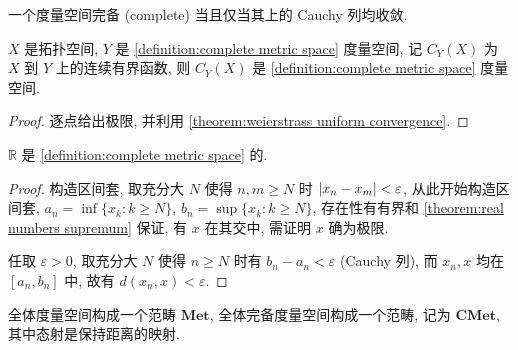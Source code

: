 \begin{definition}[完备]
    \label {definition:complete metric space}
    一个度量空间完备 (complete) 当且仅当其上的 Cauchy 列均收敛.
\end{definition}

\begin{corollary}
    \(X\) 是拓扑空间, \(Y\) 是 \ref{definition:complete metric space} 度量空间, 记 \(C_Y (X)\) 为 \(X\) 到 \(Y\) 上的连续有界函数, 则 \(C_Y (X)\) 是 \ref{definition:complete metric space} 度量空间.

    \begin{proof}
        逐点给出极限, 并利用 \ref{theorem:weierstrass uniform convergence}.
    \end{proof}
\end{corollary}

\begin{lemma}
    \(\mathbb{R}\) 是 \ref{definition:complete metric space} 的.

    \begin{proof}
        构造区间套, 取充分大 \(N\) 使得 \(n,m \ge N\) 时 \(\abs{x_n - x_m} < \varepsilon\),
        从此开始构造区间套, \(a_n = \inf \{x_k : k \ge N\}\), \(b_n = \sup \{x_k : k \ge N\}\),
        存在性有有界和 \ref {theorem:real numbers supremum} 保证, 有 \(x\) 在其交中, 需证明 \(x\) 确为极限.

        任取 \(\varepsilon > 0\), 取充分大 \(N\) 使得 \(n \ge N\) 时有 \(b_n - a_n < \varepsilon\) (Cauchy 列),
        而 \(x_n, x\) 均在 \([a_n,b_n]\) 中, 故有 \(d(x_n,x) < \varepsilon\).
    \end{proof}
\end{lemma}

\begin{definition}
    全体度量空间构成一个范畴 \(\mathbf{Met}\), 全体完备度量空间构成一个范畴, 记为 \(\mathbf{CMet}\), 其中态射是保持距离的映射.
\end{definition}

